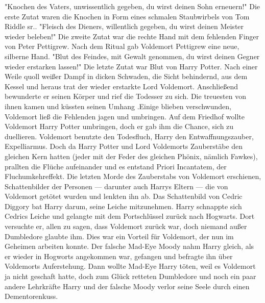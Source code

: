 \documentclass[a4paper, 10pt]{article}
\begin{document}
\vspace{10pt}
\newline
{}  
"Knochen des Vaters, unwissentlich gegeben, du wirst deinen Sohn erneuern!"
Die erste Zutat waren die Knochen in Form eines schmalen Staubwirbels von Tom Riddle sr..
\vspace{10pt}
\newline
{}  
"Fleisch des Dieners, willentlich gegeben, du wirst deinen Meister wieder beleben!"
Die zweite Zutat war die rechte Hand mit dem fehlenden Finger von Peter Pettigrew. Nach dem Ritual gab Voldemort Pettigrew eine neue, silberne Hand.
\vspace{10pt}
\newline
{}  
"Blut des Feindes, mit Gewalt genommen, du wirst deinen Gegner wieder erstarken lassen!"
Die letzte Zutat war Blut von Harry Potter.
\vspace{10pt}
\newline
{}  
Nach einer Weile quoll weißer Dampf in dicken Schwaden, die Sicht behindernd, aus dem Kessel und heraus trat der wieder erstarkte Lord Voldemort.
\vspace{10pt}
\newline
{}  
Anschließend bewunderte er seinen Körper und rief die Todesser zu sich. Die treuesten von ihnen kamen und küssten seinen Umhang .Einige blieben verschwunden, Voldemort ließ die Fehlenden jagen und umbringen.
\vspace{10pt}
\newline
{}  
Auf dem Friedhof wollte Voldemort Harry Potter umbringen, doch er gab ihm die Chance, sich zu duellieren. Voldemort benutzte den Todesfluch, Harry den Entwaffnungszauber, Expelliarmus. Doch da Harry Potter und Lord Voldemorts Zauberstäbe den gleichen Kern hatten (jeder mit der Feder des gleichen Phönix, nämlich Fawkes), prallten die Flüche aufeinander und es entstand Priori Incantatem, der Fluchumkehreffekt. Die letzten Morde des Zauberstabs von Voldemort erschienen, Schattenbilder der Personen — darunter auch Harrys Eltern — die von Voldemort getötet wurden und lenkten ihn ab. Das Schattenbild von Cedric Diggory bat Harry darum, seine Leiche mitzunehmen. Harry schnappte sich Cedrics Leiche und gelangte mit dem Portschlüssel zurück nach Hogwarts. Dort versuchte er, allen zu sagen, dass Voldemort zurück war, doch niemand außer Dumbledore glaubte ihm. Dies war ein Vorteil für Voldemort, der nun im Geheimen arbeiten konnte. Der falsche Mad-Eye Moody nahm Harry gleich, als er wieder in Hogworts angekommen war, gefangen und befragte ihn über Voldemorts Auferstehung. Dann wollte Mad-Eye Harry töten, weil es Voldemort ja nicht geschaft hatte, doch zum Glück retteten Dumbledore und noch ein paar andere Lehrkräfte Harry und der falsche Moody verlor seine Seele durch einen Dementorenkuss.
\end{document}
